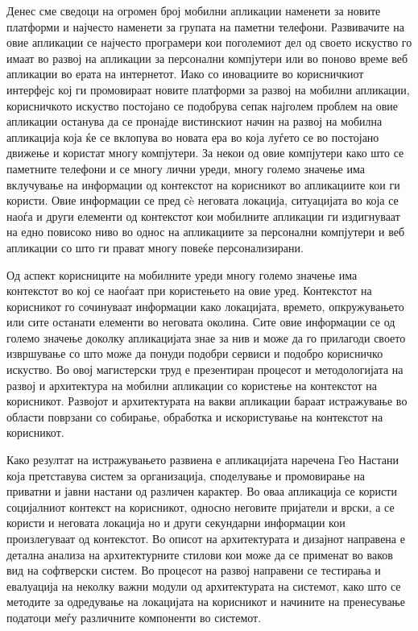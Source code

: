 Денес сме сведоци на огромен број мобилни апликации наменети за новите платформи
и најчесто наменети за групата на паметни телефони. Развивачите на овие
апликации се најчесто програмери кои поголемиот дел од своето искуство го имаат
во развој на апликации за персонални компјутери или во поново време веб
апликации во ерата на интернетот. Иако со иновациите во корисничкиот интерфејс
кој ги промовираат новите платформи за развој на мобилни апликации, корисничкото
искуство постојано се подобрува сепак најголем проблем на овие апликации
останува да се пронајде вистинскиот начин на развој на мобилна апликација која
ќе се вклопува во новата ера во која луѓето се во постојано движење и користат
многу компјутери. За некои од овие компјутери како што се паметните телефони и
се многу лични уреди, многу големо значење има вклучување на информации од
контекстот на корисникот во апликациите кои ги користи. Овие информации се пред
сè неговата локација, ситуацијата во која се наоѓа и други елементи од
контекстот кои мобилните апликации ги издигнуваат на едно повисоко ниво во однос
на апликациите за персонални компјутери и веб апликации со што ги прават многу
повеќе персонализирани.

Од аспект корисниците на мобилните уреди многу големо значење има контекстот во
кој се наоѓаат при користењето на овие уред. Контекстот на корисникот го
сочинуваат информации како локацијата, времето, опкружувањето или сите останати
елементи во неговата околина. Сите овие информации се од големо значење доколку
апликацијата знае за нив и може да го прилагоди своето извршување со што може да
понуди подобри сервиси и подобро корисничко искуство. Во овој магистерски труд е
презентиран процесот и методологијата на развој и архитектура на мобилни
апликации со користење на контекстот на корисникот. Развојот и архитектурата на
вакви апликации бараат истражување во области поврзани со собирање, обработка и
искористување на контекстот на корисникот.

Како резултат на истражувањето развиена е апликацијата наречена Гео Настани која
претставува систем за организација, споделување и промовирање на приватни и
јавни настани од различен карактер. Во оваа апликација се користи социјалниот
контекст на корисникот, односно неговите пријатели и врски, а се користи и
неговата локација но и други секундарни информации кои произлегуваат од
контекстот. Во описот на архитектурата и дизајнот направена е детална анализа на
архитектурните стилови кои може да се применат во ваков вид на софтверски
систем. Во процесот на развој направени се тестирања и евалуација на неколку
важни модули од архитектурата на системот, како што се методите за одредување на
локацијата на корисникот и начините на пренесување податоци меѓу различните
компоненти во системот.

